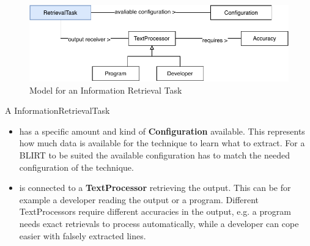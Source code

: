 \documentclass[\myrootdir/main.tex]{subfiles}
\begin{document}
\begin{figure}[htbp]
	\centering
	\includegraphics[width=\textwidth, clip]{img/ir-task.pdf}
	\caption{Model for an Information Retrieval Task}
	\label{fig:model-ir-task}
\end{figure}

A InformationRetrievalTask
\begin{itemize}
	\item has a specific amount and kind of \textbf{Configuration} available.
	      This represents how much data is available for the technique to learn what to extract.
	      For a BLIRT to be suited the available configuration has to match the needed configuration of the technique.
	\item is connected to a \textbf{TextProcessor} retrieving the output.
	      This can be for example a developer reading the output or a program.
	      Different TextProcessors require different accuracies in the output, e.g. a program needs exact retrievals to process automatically, while a developer can cope easier with falsely extracted lines.
\end{itemize}
\end{document}
